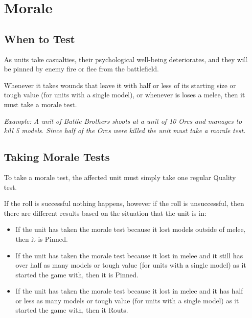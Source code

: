 \documentclass[9pt, a4paper, bookmarks=false]{extarticle}            %
\begin{document}

\newpage



\section{Morale}

\begin{multicols}{2}

\subsection{When to Test}

As units take casualties, their psychological well-being deteriorates, and they will be pinned by enemy fire or flee from the battlefield.

Whenever it takes wounds that leave it with half or less of its starting size or tough value (for units with a single model), or whenever is loses a melee, then it must take a morale test.

\textit{Example: A unit of Battle Brothers shoots at a unit of 10 Orcs and manages to kill 5 models. Since half of the Orcs were killed the unit must take a morale test.}

\subsection{Taking Morale Tests}

To take a morale test, the affected unit must simply take one regular Quality test.

If the roll is successful nothing happens, however if the roll is unsuccessful, then there are different results based on the situation that the unit is in:

\begin{itemize}
  \item If the unit has taken the morale test because it lost models outside of melee, then it is Pinned.
  \item If the unit has taken the morale test because it lost in melee and it still has over half as many models or tough value (for units with a single model) as it started the game with, then it is Pinned.
  \item If the unit has taken the morale test because it lost in melee and it has half or less as many models or tough value (for units with a single model) as it started the game with, then it Routs.
\end{itemize}


\end{multicols}
\end{document}
